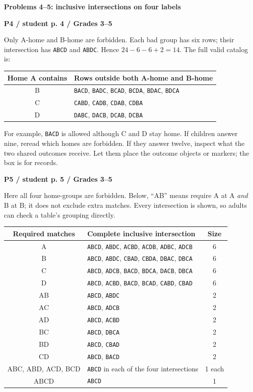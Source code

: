 \documentclass[11pt]{article}
\newcommand{\heading}[1]{\par\textbf{\large #1}\par}
\newcommand{\subhead}[1]{\par\textbf{#1}\par}
\newcommand{\row}[1]{\texttt{#1}}
\newcommand{\guidepage}{\newpage}
\begin{document}
\guidepage
\heading{Problems 4--5: inclusive intersections on four labels}

\subhead{P4 / student p. 4 / Grades 3--5}
Only A-home and B-home are forbidden. Each bad group has six rows; their intersection has \row{ABCD} and \row{ABDC}. Hence $24-6-6+2=\boxed{14}$. The full valid catalog is:
\begin{center}\begin{tabular}{@{}cl@{}}\toprule
Home A contains & Rows outside both A-home and B-home\\\midrule
B&\row{BACD}, \row{BADC}, \row{BCAD}, \row{BCDA}, \row{BDAC}, \row{BDCA}\\
C&\row{CABD}, \row{CADB}, \row{CDAB}, \row{CDBA}\\
D&\row{DABC}, \row{DACB}, \row{DCAB}, \row{DCBA}\\\bottomrule
\end{tabular}\end{center}
For example, \row{BACD} is allowed although C and D stay home. If children answer nine, reread which homes are forbidden. If they answer twelve, inspect what the two shared outcomes receive. Let them place the outcome objects or markers; the box is for records.

\subhead{P5 / student p. 5 / Grades 3--5}
Here all four home-groups are forbidden. Below, ``AB'' means require A at A \emph{and} B at B; it does not exclude extra matches. Every intersection is shown, so adults can check a table's grouping directly.
\begin{center}\small\begin{tabular}{@{}clc@{}}\toprule
Required matches & Complete inclusive intersection & Size\\\midrule
A&\row{ABCD}, \row{ABDC}, \row{ACBD}, \row{ACDB}, \row{ADBC}, \row{ADCB}&6\\
B&\row{ABCD}, \row{ABDC}, \row{CBAD}, \row{CBDA}, \row{DBAC}, \row{DBCA}&6\\
C&\row{ABCD}, \row{ADCB}, \row{BACD}, \row{BDCA}, \row{DACB}, \row{DBCA}&6\\
D&\row{ABCD}, \row{ACBD}, \row{BACD}, \row{BCAD}, \row{CABD}, \row{CBAD}&6\\
AB&\row{ABCD}, \row{ABDC}&2\\
AC&\row{ABCD}, \row{ADCB}&2\\
AD&\row{ABCD}, \row{ACBD}&2\\
BC&\row{ABCD}, \row{DBCA}&2\\
BD&\row{ABCD}, \row{CBAD}&2\\
CD&\row{ABCD}, \row{BACD}&2\\
ABC, ABD, ACD, BCD&\row{ABCD} in each of the four intersections&1 each\\
ABCD&\row{ABCD}&1\\\bottomrule
\end{tabular}\end{center}
\end{document}
